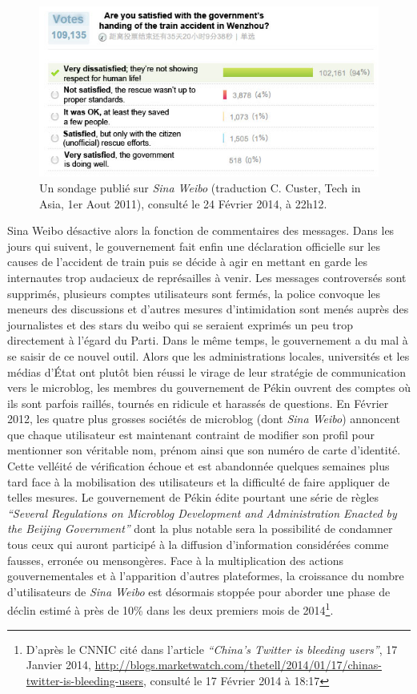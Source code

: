 \begin{figure}[h]
    \centering
    \includegraphics[scale=0.7]{figures/chap1/train.jpg}
    \caption[Sondage Weibo concernant l'accident de train de Wenzhou]{Un sondage publié sur \textit{Sina Weibo} (traduction C. Custer, Tech in Asia, 1er Aout 2011), consulté le 24 Février 2014, à 22h12.}
    \label{fig:poll_weibo}
\end{figure}

Sina Weibo désactive alors la fonction de commentaires des messages. Dans les jours qui suivent, le gouvernement fait enfin une déclaration officielle sur les causes de l’accident de train puis se décide à agir en mettant en garde les internautes trop audacieux de représailles à venir. Les messages controversés sont supprimés, plusieurs comptes utilisateurs sont fermés, la police convoque les meneurs des discussions et d’autres mesures d’intimidation sont menés auprès des journalistes et des stars du weibo qui se seraient exprimés un peu trop directement à l’égard du Parti. Dans le même temps, le gouvernement a du mal à se saisir de ce nouvel outil. Alors que les administrations locales, universités et les médias d’État ont plutôt bien réussi le virage de leur stratégie de communication vers le microblog, les membres du gouvernement de Pékin ouvrent des comptes où ils sont parfois raillés, tournés en ridicule et harassés de questions. En Février 2012, les quatre plus grosses sociétés de microblog (dont \textit{Sina Weibo}) annoncent que chaque utilisateur est maintenant contraint de modifier son profil pour mentionner son véritable nom, prénom ainsi que son numéro de carte d’identité. Cette velléité de vérification échoue et est abandonnée quelques semaines plus tard face à la mobilisation des utilisateurs et la difficulté de faire appliquer de telles mesures. Le gouvernement de Pékin édite pourtant une série de règles \textit{“Several Regulations on Microblog Development and Administration Enacted by the Beijing Government”} dont la plus notable sera la possibilité de condamner tous ceux qui auront participé à la diffusion d’information considérées comme fausses, erronée ou mensongères. Face à la multiplication des actions gouvernementales et à l’apparition d’autres plateformes, la croissance du nombre d’utilisateurs de \textit{Sina Weibo} est désormais stoppée pour aborder une phase de déclin estimé à près de 10\% dans les deux premiers mois de 2014\footnote{D’après le CNNIC cité dans l’article  \textit{“China’s Twitter is bleeding users”}, 17 Janvier 2014, \url{http://blogs.marketwatch.com/thetell/2014/01/17/chinas-twitter-is-bleeding-users}, consulté le 17 Février 2014 à 18:17}. 

